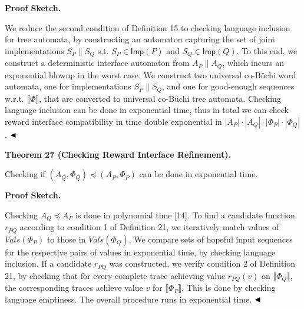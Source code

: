  
 
 
\par\medskip\noindent\textbf{Proof Sketch.}\par
 
 
We reduce the second condition of Definition 15 to checking language inclusion for tree automata, by constructing an automaton capturing the set of joint implementations $S_{P}\parallel S_{Q}$ s.t. $S_{P}\in\mathsf{Imp}(P)$ and $S_{Q}\in\mathsf{Imp}(Q)$. To this end, we construct a deterministic interface automaton from $A_{P}\parallel A_{Q}$, which incurs an exponential blowup in the worst case. We construct two universal co-Büchi word automata, one for implementations $S_{P}\parallel S_{Q}$, and one for good-enough sequences w.r.t. $\llbracket\Phi\rrbracket$, that are converted to universal co-Büchi tree automata. Checking language inclusion can be done in exponential time, thus in total we can check reward interface compatibility in time double exponential in $|A_{P}|\cdot|A_{Q}|\cdot|\Phi_{P}|\cdot|\Phi_{Q}|$. $\hfill\blacktriangleleft$\par
 
 
 
\par\medskip\noindent\textbf{Theorem 27 (Checking Reward Interface Refinement).}\par
 
 
Checking if $(A_{Q},\Phi_{Q})\preceq(A_{P},\Phi_{P})$ can be done in exponential time.\par
 
 
 
 
 
\par\medskip\noindent\textbf{Proof Sketch.}\par
 
 
Checking $A_{Q}\preceq A_{P}$ is done in polynomial time [14]. To find a candidate function $r_{PQ}$ according to condition 1 of Definition 21, we iteratively match values of $\mathit{Vals}(\Phi_{P})$ to those in $\mathit{Vals}(\Phi_{Q})$. We compare sets of hopeful input sequences for the respective pairs of values in exponential time, by checking language inclusion. If a candidate $r_{PQ}$ was constructed, we verify condition 2 of Definition 21, by checking that for every complete trace achieving value $r_{PQ}(v)$ on $\llbracket\Phi_{Q}\rrbracket$, the corresponding traces achieve value $v$ for $\llbracket\Phi_{P}\rrbracket$. This is done by checking language emptiness. The overall procedure runs in exponential time. $\hfill\blacktriangleleft$\par
 
